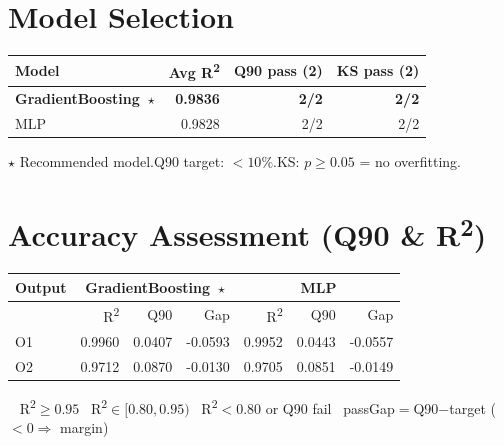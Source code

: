 \documentclass[9pt,a4paper]{article}
\begin{document}
\section{Model Selection}
\begin{minipage}{\linewidth}
\renewcommand{\arraystretch}{1.2}
\begin{tabular}{|l|r|r|r|}
  \hline
  \textbf{Model} & \textbf{Avg R\textsuperscript{2}} & \textbf{Q90 pass (2)} & \textbf{KS pass (2)} \\ \hline
  {\bfseries GradientBoosting\ $\star$} & {\bfseries 0.9836} & {\bfseries 2/2} & {\bfseries 2/2} \\ \hline
  { MLP} & { 0.9828} & { 2/2} & { 2/2} \\ \hline
\end{tabular}
\par\vspace{4pt}
{\footnotesize $\star$ Recommended model.\enspace Q90 target: $<10\%$.\enspace KS: $p\geq 0.05$ = no overfitting.}
\end{minipage}

\section{Accuracy Assessment (Q90 \& R\textsuperscript{2})}
\begin{minipage}{\linewidth}
\renewcommand{\arraystretch}{1.2}
\begin{tabular}{l|rrr|rrr|}
  \hline
  \textbf{Output} & \multicolumn{3}{c|}{\textbf{GradientBoosting}\ $\star$} & \multicolumn{3}{c|}{\textbf{MLP}} \\ \hline
  & R\textsuperscript{2} & Q90 & Gap & R\textsuperscript{2} & Q90 & Gap \\ \hline
  O1 & \cellcolor{r2green}0.9960 & \cellcolor{passgreen}0.0407 & \cellcolor{passgreen}-0.0593 & \cellcolor{r2green}0.9952 & \cellcolor{passgreen}0.0443 & \cellcolor{passgreen}-0.0557 \\ \hline
  O2 & \cellcolor{r2green}0.9712 & \cellcolor{passgreen}0.0870 & \cellcolor{passgreen}-0.0130 & \cellcolor{r2green}0.9705 & \cellcolor{passgreen}0.0851 & \cellcolor{passgreen}-0.0149 \\ \hline
\end{tabular}
\par\vspace{4pt}
{\footnotesize \colorbox{r2green}{\ } R\textsuperscript{2}$\!\geq\!0.95$\enspace \colorbox{r2amber}{\ } R\textsuperscript{2}$\!\in[0.80,0.95)$\enspace \colorbox{failred}{\ } R\textsuperscript{2}$\!<\!0.80$ or Q90 fail\enspace \colorbox{passgreen}{\ } pass\enspace Gap$=$Q90$-$target ($<\!0\Rightarrow$ margin)}
\end{minipage}
\end{document}
